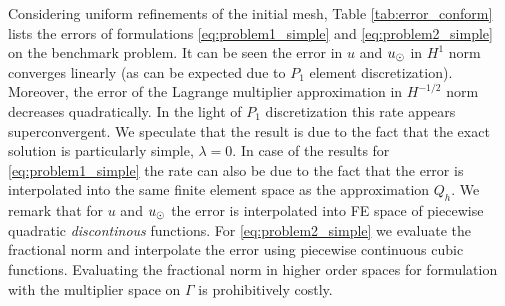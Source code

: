 Considering uniform refinements of the initial mesh, Table \ref{tab:error_conform}
lists the errors of formulations \eqref{eq:problem1_simple} and \eqref{eq:problem2_simple}
on the benchmark problem. It can be seen the error in $u$ and $u_{\odot}$ in $H^1$ norm
converges linearly (as can be expected due to $P_1$ element discretization).
Moreover, the error of the Lagrange multiplier approximation in $H^{-1/2}$ norm
decreases quadratically. In the light of $P_1$ discretization this rate appears
superconvergent. We speculate that the result is due to the fact that the
exact solution is particularly simple, $\lambda=0$. In case of the results for
\eqref{eq:problem1_simple} the rate can also be due to the fact that the
error is interpolated into the same finite element space as the approximation $Q_h$.
We remark that for $u$ and $u_{\odot}$ the error is interpolated into FE space of piecewise
quadratic \emph{discontinous} functions. For \eqref{eq:problem2_simple} we
evaluate the fractional norm and interpolate the error using piecewise continuous
cubic functions. Evaluating the fractional norm in higher order spaces
for formulation with the multiplier space on $\Gamma$ is prohibitively costly. 


